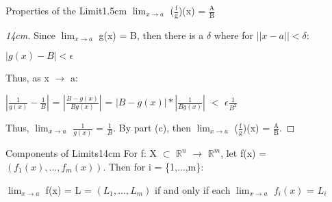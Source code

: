 \begin{ltheorem}{Properties of the Limit}{1.5cm}
            \hspace{0.5cm}
            $\lim_{x \rightarrow a}$ ($\frac{\text{f}}{\text{g}}$)(x)
            = $\frac{\text{A}}{\text{B}}$

            \begin{proof}[14cm]
                Since $\lim_{x \rightarrow a}$ g(x) = B, then there is a
                $\delta$ where for $||x-a|| < \delta$:

                \hspace{0.5cm}
                $|g(x) - B| < \epsilon$

                Thus, as x $\rightarrow$ a:

                \hspace{0.5cm}
                $|\frac{1}{g(x)} - \frac{1}{B}|$
                = $|\frac{B-g(x)}{Bg(x)}|$
                = $|B-g(x)| * |\frac{1}{Bg(x)}|$
                $<$ $\epsilon \frac{1}{B^2}$

                Thus, $\lim_{x \rightarrow a}$ $\frac{1}{g(x)}$ = $\frac{1}{B}$.
                By part (c), then
                $\lim_{x \rightarrow a}$ ($\frac{\text{f}}{\text{g}}$)(x)
                = $\frac{\text{A}}{\text{B}}$.
            \end{proof}
    \end{ltheorem}

    \vspace{0.5cm}



    \begin{wtheorem}{Components of Limits}{14cm}
        For f: X $\subset$ $\mathbb{R}^n$ $\rightarrow$ $\mathbb{R}^m$,
        let f(x) = $(f_1(x),...,f_m(x))$. Then for i = \{1,...,m\}:

        \hspace{0.5cm}
        $\lim_{x \rightarrow a}$ f(x) = L = $(L_1,...,L_m)$ if and only if each
        $\lim_{x \rightarrow a}$ $f_i(x)$ = $L_i$ 
    \end{wtheorem}

